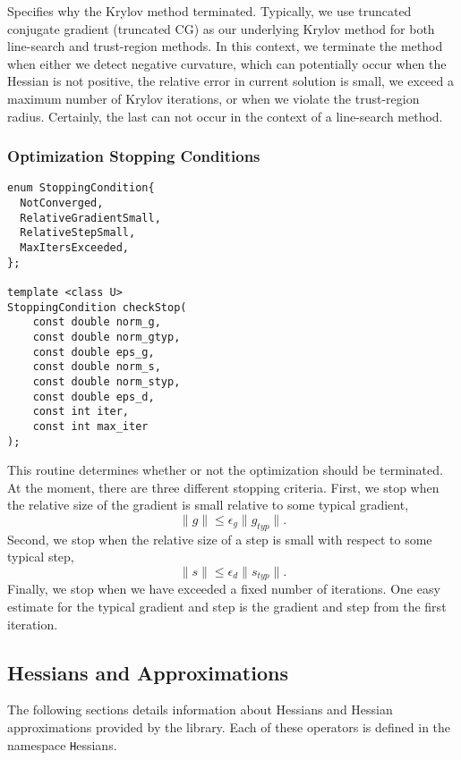 \documentclass{article}
\begin{document}
Specifies why the Krylov method terminated.  Typically, we use truncated conjugate gradient (truncated CG) as our underlying Krylov method for both line-search and trust-region methods.  In this context, we terminate the method when either we detect negative curvature, which can potentially occur when the Hessian is not positive, the relative error in current solution is small, we exceed a maximum number of Krylov iterations, or when we violate the trust-region radius.  Certainly, the last can not occur in the context of a line-search method.

\subsubsection{Optimization Stopping Conditions}

\begin{flushleft}
\begin{lstlisting}
enum StoppingCondition{
  NotConverged,            
  RelativeGradientSmall,    
  RelativeStepSmall,         
  MaxItersExceeded,           
};

template <class U>
StoppingCondition checkStop(
    const double norm_g,
    const double norm_gtyp,
    const double eps_g,
    const double norm_s,
    const double norm_styp,
    const double eps_d,
    const int iter,
    const int max_iter
);
\end{lstlisting}
\end{flushleft}

This routine determines whether or not the optimization should be terminated.  At the moment, there are three different stopping criteria.  First, we stop when the relative size of the gradient is small relative to some typical gradient,
$$
	\|g\|\leq \epsilon_g \|g_{typ}\|.
$$
Second, we stop when the relative size of a step is small with respect to some typical step,
$$
	\|s\|\leq \epsilon_d \|s_{typ}\|.
$$
Finally, we stop when we have exceeded a fixed number of iterations.  One easy estimate for the typical gradient and step is the gradient and step from the first iteration.

\subsection{Hessians and Approximations}

The following sections details information about Hessians and Hessian approximations provided by the library.  Each of these operators is defined in the namespace {\texttt Hessians}.
\end{document}
